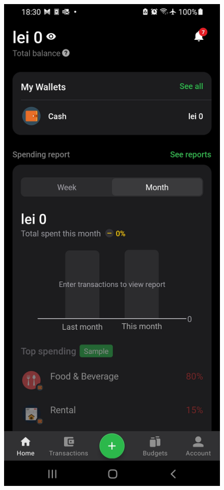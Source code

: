 \begin{figure}[htbp]
  \centering
  \begin{minipage}[b]{0.27\textwidth}
    \includegraphics[width=\textwidth]{Screen Shots/MoneyLover/D_MainMenu.jpg}

\end{minipage}
\end{figure}

